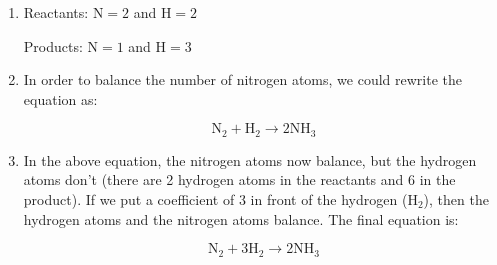 {\begin{mdframed}[linewidth=4, leftmargin=40, rightmargin=40]
\begin{exercise}
\begin{enumerate}[noitemsep, label=\textbf{Step} \textbf{\arabic*}. ]
    \begin{equation}
    {\mathrm{N}}_{2}+{\mathrm{H}}_{2}\to {\mathrm{NH}}_{3}\tag{13.12}
      \end{equation}
        \par 
        \item  
        \label{m38726*id64485}Reactants: $\mathrm{N}=2$ and $\mathrm{H}=2$\par 
        \label{m38726*id64488}Products: $\mathrm{N}=1$ and $\mathrm{H}=3$\par 
        \item  
        \label{m38726*id64495}In order to balance the number of nitrogen atoms, we could rewrite the equation as:
        \label{m38726*id798543}\nopagebreak\noindent{}
        
    \begin{equation}
    {\mathrm{N}}_{2}+{\mathrm{H}}_{2}\to 2{\mathrm{NH}}_{3}\tag{13.13}
      \end{equation}
        \par 
        \item  
        \label{m38726*id64550}In the above equation, the nitrogen atoms now balance, but the hydrogen atoms don't (there are 2 hydrogen atoms in the reactants and 6 in the product). If we put a coefficient of 3 in front of the hydrogen (${\mathrm{H}}_{2}$), then the hydrogen atoms and the nitrogen atoms balance. The final equation is:
              \label{m38726*id756543}\nopagebreak\noindent{}
        
    \begin{equation}
    {\mathrm{N}}_{2}+3{\mathrm{H}}_{2}\to 2{\mathrm{NH}}_{3}\tag{13.14}
      \end{equation}
        \par 
\end{enumerate}
    \end{exercise}
    \end{mdframed}
    }
    \noindent
\par
            \label{m38726*secfhsst!!!underscore!!!id590}\vspace{.5cm} 
      \noindent
